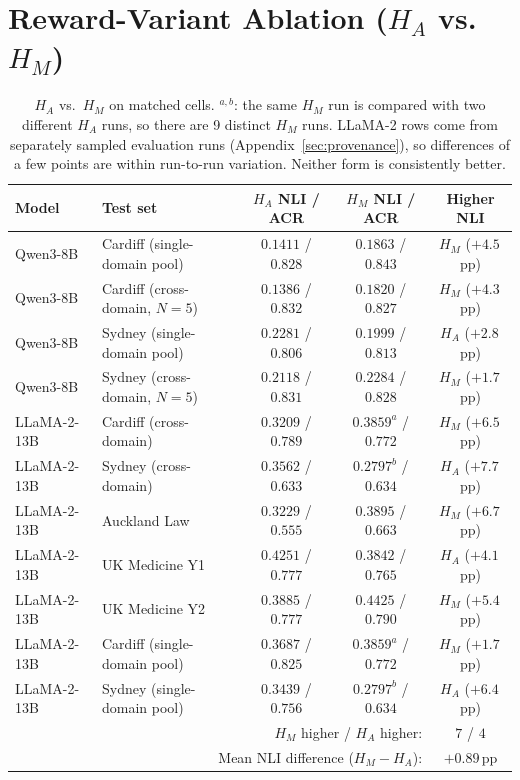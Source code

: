 \section{Reward-Variant Ablation ($H_A$ vs.\ $H_M$)}
\label{sec:variant_ablation_appendix}
\begin{table}[h]
\centering
\small
\begin{tabular}{l|l|c|c|c}
\toprule
Model & Test set & $H_A$ NLI / ACR & $H_M$ NLI / ACR & Higher NLI \\
\midrule
Qwen3-8B  & Cardiff (single-domain pool)   & $0.1411$ / $0.828$ & $0.1863$ / $0.843$ & $H_M$ ($+4.5$\,pp) \\
Qwen3-8B  & Cardiff (cross-domain, $N{=}5$) & $0.1386$ / $0.832$ & $0.1820$ / $0.827$ & $H_M$ ($+4.3$\,pp) \\
Qwen3-8B  & Sydney (single-domain pool)    & $0.2281$ / $0.806$ & $0.1999$ / $0.813$ & $H_A$ ($+2.8$\,pp) \\
Qwen3-8B  & Sydney (cross-domain, $N{=}5$) & $0.2118$ / $0.831$ & $0.2284$ / $0.828$ & $H_M$ ($+1.7$\,pp) \\
LLaMA-2-13B & Cardiff (cross-domain)  & $0.3209$ / $0.789$ & $0.3859^{a}$ / $0.772$ & $H_M$ ($+6.5$\,pp) \\
LLaMA-2-13B & Sydney (cross-domain)   & $0.3562$ / $0.633$ & $0.2797^{b}$ / $0.634$ & $H_A$ ($+7.7$\,pp) \\
LLaMA-2-13B & Auckland Law            & $0.3229$ / $0.555$ & $0.3895$ / $0.663$ & $H_M$ ($+6.7$\,pp) \\
LLaMA-2-13B & UK Medicine Y1          & $0.4251$ / $0.777$ & $0.3842$ / $0.765$ & $H_A$ ($+4.1$\,pp) \\
LLaMA-2-13B & UK Medicine Y2          & $0.3885$ / $0.777$ & $0.4425$ / $0.790$ & $H_M$ ($+5.4$\,pp) \\
LLaMA-2-13B & Cardiff (single-domain pool) & $0.3687$ / $0.825$ & $0.3859^{a}$ / $0.772$ & $H_M$ ($+1.7$\,pp) \\
LLaMA-2-13B & Sydney (single-domain pool)  & $0.3439$ / $0.756$ & $0.2797^{b}$ / $0.634$ & $H_A$ ($+6.4$\,pp) \\
\midrule
\multicolumn{4}{r|}{$H_M$ higher / $H_A$ higher:} & $7$ / $4$ \\
\multicolumn{4}{r|}{Mean NLI difference ($H_M-H_A$):} & $+0.89$\,pp \\
\bottomrule
\end{tabular}
\caption{$H_A$ vs.\ $H_M$ on matched cells. $^{a,b}$: the same $H_M$ run is compared with two different $H_A$ runs, so there are 9 distinct $H_M$ runs. LLaMA-2 rows come from separately sampled evaluation runs (Appendix~\ref{sec:provenance}), so differences of a few points are within run-to-run variation. Neither form is consistently better.}
\label{tab:variant_ablation}
\end{table}

